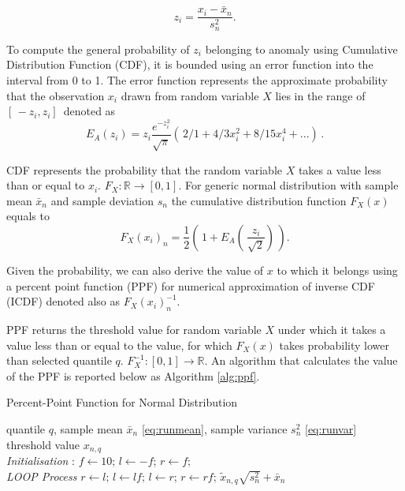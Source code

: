 \begin{equation}
z_i = \frac{x_i - \bar x_n}{s^2_n}\text{.}\label{eq:zscore}
\end{equation}


To compute the general probability of $z_i$ belonging to anomaly using Cumulative Distribution Function (CDF), it is bounded using an error function into the interval from 0 to 1. The error function represents the approximate probability that the observation \(x_i\) drawn from random variable \(X\) lies in the range of \([\,-z_i,z_i]\,\) denoted as
\begin{equation}
E_A (z_i) = z_i\frac{e^{-z^2_i}}{\sqrt{\pi}}( \,2/1 + 4/3x^2_i + 8/15 x^4_i + ...) \,\text{.}\label{eq:erf}
\end{equation}

CDF represents the probability that the random variable \(X\) takes a value less than or equal to \(x_i\). \(F_X\colon \mathbb{R} \to [0,1]\). For generic normal distribution with sample mean \(\bar x_n\) and sample deviation \(s_n\) the cumulative distribution function \(F_X(x)\) equals to
\begin{equation}
F_X(x_i)_n = \frac{1}{2}( \,1+E_A(\,\frac{z_i}{\sqrt{2}})\,) \text{.}\label{eq:cdf}
\end{equation}

Given the probability, we can also derive the value of \(x\) to which it belongs using a percent point function (PPF) for numerical approximation of inverse CDF (ICDF) denoted also as $F_X(x_i)^{-1}_n$.

PPF returns the threshold value for random variable \(X\) under which it takes a value less than or equal to the value, for which \(F_X(x)\) takes probability lower than selected quantile \(q\). \(F_X^{-1}\colon [0, 1] \to \mathbb{R}\). An algorithm that calculates the value of the PPF is reported below as Algorithm \ref{alg:ppf}.

\begin{algorithm}[H]
\caption{{Percent-Point Function for Normal Distribution}} \label{alg:ppf}
 \begin{algorithmic}[1]
 \renewcommand{\algorithmicrequire}{\textbf{Input:}}
 \renewcommand{\algorithmicensure}{\textbf{Output:}}
 \REQUIRE quantile $q$, sample mean $\bar x_n$ \eqref{eq:runmean}, sample variance $s^2_n$ \eqref{eq:runvar}
 \ENSURE  threshold value $x_{n,q}$
 \\ \textit{Initialisation} :
  \STATE $f \leftarrow 10$; $l \leftarrow -f $; $r \leftarrow f;$
 \\ \textit{LOOP Process}
  \STATE $r \leftarrow l $;
  \STATE $l \leftarrow lf $;
  \ENDWHILE
    \STATE $l \leftarrow r $;
    \STATE $r \leftarrow rf $;
  \ENDWHILE
 \RETURN $\tilde{x}_{n,q}  \sqrt{s^2_n} + \bar x_n $
 \end{algorithmic}
\end{algorithm}


